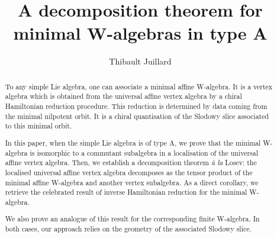 \documentclass[10pt,a4paper]{amsart}
\title{A decomposition theorem for minimal W-algebras in type A}
\author{Thibault Juillard}
\numberwithin{equation}{subsection}
\theoremstyle{definition}
\theoremstyle{remark}
\begin{document}
	
\begin{abstract}
	To any simple Lie algebra, one can associate a minimal affine W-algebra. It is a vertex algebra which is obtained from the universal affine vertex algebra by a chiral Hamiltonian reduction procedure. This reduction is determined by data coming from the minimal nilpotent orbit. It is a chiral quantisation of the Slodowy slice associated to this minimal orbit.
	
	In this paper, when the simple Lie algebra is of type A, we prove that the minimal W-algebra is isomorphic to a commutant subalgebra in a localisation of the universal affine vertex algebra. Then, we establish a decomposition theorem \emph{à la} Losev: the localised universal affine vertex algebra decomposes as the tensor product of the minimal affine W-algebra and another vertex subalgebra. As a direct corollary, we retrieve the celebrated result of inverse Hamiltonian reduction for the minimal W-algebra.
	
	We also prove an analogue of this result for the corresponding finite W-algebra. In both cases, our approach relies on the geometry of the associated Slodowy slice.
\end{abstract}



\maketitle



\tableofcontents


















\printbibliography
	
	
\end{document}
